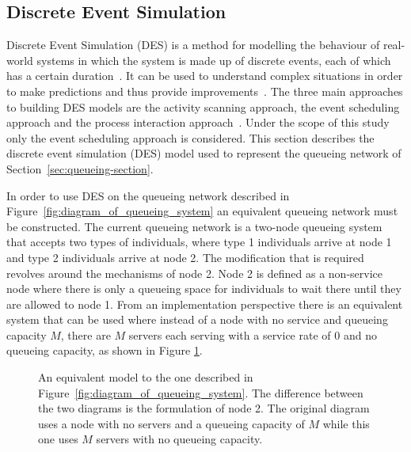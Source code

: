 \subsection{Discrete Event Simulation}

Discrete Event Simulation (DES) is a method for modelling the behaviour of
real-world systems in which the system is made up of discrete events, each of
which has a certain duration~\cite{DESstewart}.
It can be used to understand complex situations in order to make predictions
and thus provide improvements~\cite{VinceGeraintBook}.
The three main approaches to building DES models are the activity scanning
approach, the event scheduling approach and the process interaction
approach~\cite{DESapproaches}.
Under the scope of this study only the event scheduling approach is considered.
This section describes the discrete event simulation (DES) model used to
represent the queueing network of Section~\ref{sec:queueing-section}.

In order to use DES on the queueing network described in
Figure~\ref{fig:diagram_of_queueing_system} an equivalent queueing network must
be constructed.
The current queueing network is a two-node queueing system that accepts two
types of individuals, where type 1 individuals arrive at node 1 and
type 2 individuals arrive at node 2.
The modification that is required revolves around the mechanisms of node 2.
Node 2 is defined as a non-service node where there is only a queueing
space for individuals to wait there until they are allowed to node 1.
From an implementation perspective there is an equivalent system that can be
used where instead of a node with no service and queueing capacity \(M\), there
are \(M\) servers each serving with a service rate of \(0\) and no queueing
capacity, as shown in Figure \ref{fig:equivalent_diagram_of_queueing_system}.

\begin{figure}[h]
    \centering
    
    \caption{An equivalent model to the one described in
    Figure~\ref{fig:diagram_of_queueing_system}. The difference between the two
    diagrams is the formulation of node 2. The original diagram uses
    a node with no servers and a queueing capacity of \(M\) while this one uses
    \(M\) servers with no queueing capacity.}
    \label{fig:equivalent_diagram_of_queueing_system}
\end{figure}
    

